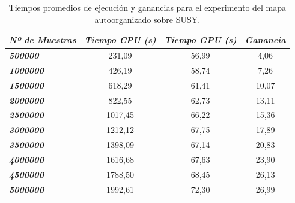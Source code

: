 \begin{table}[ht]
\begin{tabular}{@{}l|c|c|c@{}}
\textit{\textbf{Nº de Muestras}} & \multicolumn{1}{l|}{\textit{\textbf{Tiempo CPU (s)}}} & \multicolumn{1}{l|}{\textit{\textbf{Tiempo GPU (s)}}} & \multicolumn{1}{l}{\textit{\textbf{Ganancia}}} \\ \midrule
\textit{\textbf{500000}}         & 231,09                                                & 56,99                                               & 4,06                                          \\
\textit{\textbf{1000000}}        & 426,19                                                & 58,74                                               & 7,26                                           \\
\textit{\textbf{1500000}}        & 618,29                                                & 61,41                                               & 10,07                                           \\
\textit{\textbf{2000000}}        & 822,55                                                & 62,73                                               & 13,11                                           \\
\textit{\textbf{2500000}}        & 1017,45                                               & 66,22                                               & 15,36                                           \\
\textit{\textbf{3000000}}        & 1212,12                                               & 67,75                                               & 17,89                                           \\
\textit{\textbf{3500000}}        & 1398,09                                               & 67,14                                               & 20,83                                           \\
\textit{\textbf{4000000}}        & 1616,68                                               & 67,63                                               & 23,90                                           \\
\textit{\textbf{4500000}}        & 1788,50                                               & 68,45                                               & 26,13                                           \\
\textit{\textbf{5000000}}        & 1992,61                                               & 72,30                                               & 26,99                                          
\end{tabular}
\caption{Tiempos promedios de ejecución y ganancias para el experimento del mapa autoorganizado sobre SUSY.}
\label{tab:susysom}
\end{table}

